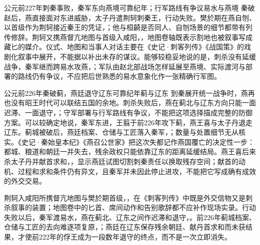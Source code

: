 \begin{event}{公元前227年}{刺秦事败，秦军东向燕境}{可靠纪年；行军路线有争议}{易水与燕境}
秦破赵后，燕直接面对东进威胁，太子丹遣荆轲刺秦王，行动失败。樊於期在燕自刎、以首级作为荆轲接近秦王的凭证，；他与桓齮是否同人、自刎场景的细节都带有列传修辞。荆轲又携燕督亢地图与首级入咸阳，，地图卷轴既表示割地也被叙事写成藏匕的媒介。仪式、地图和当事人对话主要在《史记·刺客列传》《战国策》的戏剧化叙事中展开，不能据以补出未存的谋议。能够较稳妥地说的是，刺杀没有延缓战争，秦军继而跨易水攻燕，；军队由赵北部战场怎样延展至燕境、实际渡河与部署的路线仍有争议，不应把后世熟悉的易水意象化作一张精确行军图。
\end{event}

\begin{event}{公元前226年}{秦破蓟，燕廷退守辽东}{可靠纪年}{蓟与辽东}
到秦展开统一战争时，燕再也没有昭王时代可以联结五国的余地。刺杀失败后，燕在蓟北与辽东方向只能一面迟滞、一面退守，；守军部署与行军路线有争议，不能把这项选择描成完整的防御方案。可以较确定地说，秦军东进，王翦于前226年攻下蓟，燕王喜与太子丹退走辽东。蓟城被破后，燕廷档案、仓储与工匠落入秦军，；数量与处置细节无从核实。《史记·秦始皇本纪》《燕召公世家》把这次失都记作燕国覆亡的决定性一步：都城、粮道和朝廷一并失去，残余政权只能依靠辽东的距离延缓结局。燕王喜后来杀太子丹并献首求和，，显示燕廷试图切割刺秦责任以换取残存空间；献首的动机、过程和求和条件仍有异文，且秦军并未因此停止进攻，不能把它写成确有成效的外交交易。
\end{event}

荆轲入咸阳所携督亢地图与樊於期首级，，在《刺客列传》中既是外交信物又是刺杀叙事的装置；地图卷中的匕首、席间动作和告别歌辞都不应补作现场实录。行动失败以后，秦军渡易水，燕在蓟北、辽东之间作迟滞和退守，。前226年蓟城档案、仓储与工匠的去向难逐项复原，；燕廷在辽东保存残余朝廷、献丹首求和而未获结果，才使前222年的俘王成为一段数年退守的终点，而不是一次立即消失。

